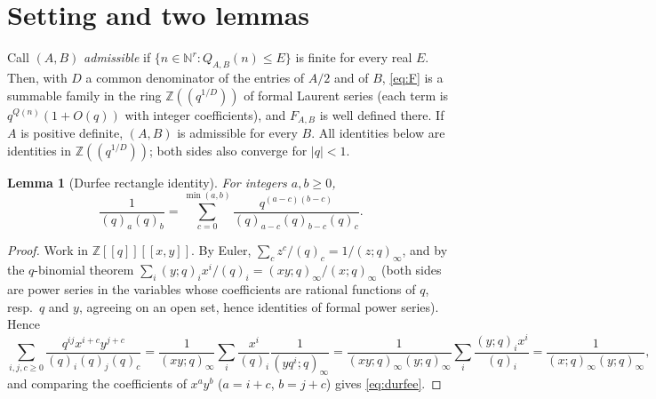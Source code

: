 \documentclass[11pt]{amsart}
\newtheorem{lemma}[theorem]{Lemma}
\theoremstyle{definition}
\numberwithin{equation}{section}
\newcommand{\Z}{\mathbb{Z}}
\newcommand{\N}{\mathbb{N}}
\begin{document}
\section{Setting and two lemmas}\label{sec:lemmas}

Call $(A,B)$ \emph{admissible} if $\{n\in\N^r:Q_{A,B}(n)\le E\}$ is finite for every real $E$. Then, with
$D$ a common denominator of the entries of $A/2$ and of $B$, \eqref{eq:F} is a summable family in the ring
$\Z((q^{1/D}))$ of formal Laurent series (each term is $q^{Q(n)}(1+O(q))$ with integer coefficients), and
$F_{A,B}$ is well defined there. If $A$ is positive definite, $(A,B)$ is admissible for every $B$. All
identities below are identities in $\Z((q^{1/D}))$; both sides also converge for $|q|<1$.

\begin{lemma}[Durfee rectangle identity]\label{lem:durfee}
For integers $a,b\ge0$,
\begin{equation}\label{eq:durfee}
\frac1{(q)_a(q)_b}=\sum_{c=0}^{\min(a,b)}\frac{q^{(a-c)(b-c)}}{(q)_{a-c}(q)_{b-c}(q)_c}.
\end{equation}
\end{lemma}
\begin{proof}
Work in $\Z[[q]][[x,y]]$. By Euler, $\sum_cz^c/(q)_c=1/(z;q)_\infty$, and by the $q$-binomial theorem
$\sum_i(y;q)_ix^i/(q)_i=(xy;q)_\infty/(x;q)_\infty$ \cite[Theorem~2.1, (2.2.5)]{AndrewsBook} (both
sides are power series in the variables whose coefficients are rational functions of $q$, resp.\ $q$ and
$y$, agreeing on an open set, hence identities of formal power series). Hence
\[
\sum_{i,j,c\ge0}\frac{q^{ij}x^{i+c}y^{j+c}}{(q)_i(q)_j(q)_c}
=\frac1{(xy;q)_\infty}\sum_i\frac{x^i}{(q)_i}\frac1{(yq^i;q)_\infty}
=\frac1{(xy;q)_\infty(y;q)_\infty}\sum_i\frac{(y;q)_ix^i}{(q)_i}=\frac1{(x;q)_\infty(y;q)_\infty},
\]
and comparing the coefficients of $x^ay^b$ ($a=i+c$, $b=j+c$) gives \eqref{eq:durfee}.
\end{proof}
\end{document}
